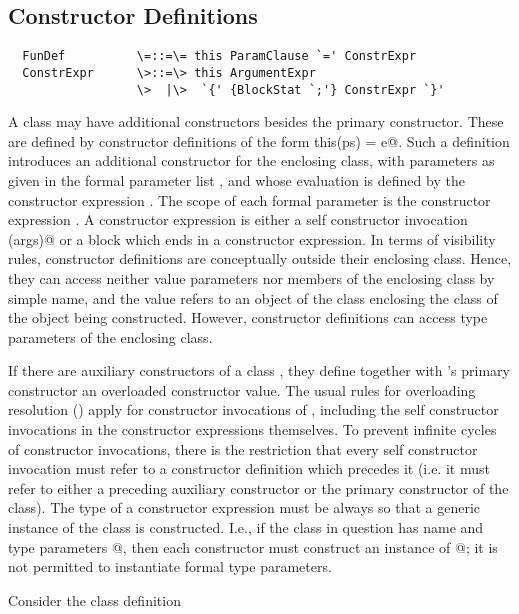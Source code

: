 \documentclass[11pt]{report}
\begin{document}
\subsection{Constructor Definitions}

\syntax\begin{verbatim}
  FunDef          \=::=\= this ParamClause `=' ConstrExpr
  ConstrExpr      \>::=\> this ArgumentExpr
                  \>  |\>  `{' {BlockStat `;'} ConstrExpr `}'
\end{verbatim}

A class may have additional constructors besides the primary
constructor.  These are defined by constructor definitions of the form
\verb@def this(ps) = e@.  Such a definition introduces an additional
constructor for the enclosing class, with parameters as given in the
formal parameter list \verb@ps@, and whose evaluation is defined by
the constructor expression \verb@e@.  The scope of each formal
parameter is the constructor expression \verb@e@.  A constructor
expression is either a self constructor invocation \verb@this(args)@
or a block which ends in a constructor expression.  In terms of
visibility rules, constructor definitions are conceptually outside
their enclosing class.  Hence, they can access neither value
parameters nor members of the enclosing class by simple name, and the
value \verb@this@ refers to an object of the class enclosing the class
of the object being constructed. However, constructor definitions can
access type parameters of the enclosing class.

If there are auxiliary constructors of a class \verb@C@, they define
together with \verb@C@'s primary constructor an overloaded constructor
value. The usual rules for overloading resolution
() apply for constructor invocations of \verb@C@,
including the self constructor invocations in the constructor
expressions themselves. To prevent infinite cycles of constructor
invocations, there is the restriction that every self constructor
invocation must refer to a constructor definition which precedes it
(i.e. it must refer to either a preceding auxiliary constructor or the
primary constructor of the class).  The type of a constructor
expression must be always so that a generic instance of the class is
constructed.  I.e., if the class in question has name \verb@C@ and type
parameters \verb@[tps]@, then each constructor must construct an
instance of \verb@C[tps]@; it is not permitted to instantiate formal
type parameters.

\example Consider the class definition
\end{document}
